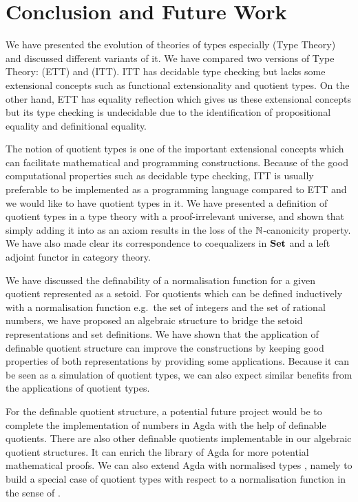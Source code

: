 \chapter{Conclusion and Future Work}

We have presented the evolution of theories of types especially \mltt (Type Theory) and discussed different variants of it.  We have compared two versions of Type Theory: \ett (ETT) and \itt (ITT). ITT has decidable type checking but lacks some extensional concepts such as functional extensionality and quotient types. On the other hand,  ETT has equality reflection which gives us these extensional concepts but its type checking is undecidable due to the identification of propositional equality and definitional equality.


The notion of quotient types is one of the important extensional concepts which can facilitate mathematical and programming constructions. Because of the good computational properties such as decidable type checking, ITT is usually preferable to be implemented as a programming language compared to ETT and we would like to have quotient types in it. We have presented a definition of quotient types in a type theory with a proof-irrelevant universe, and shown that simply adding it into \itt as an axiom results in the loss of the $\mathbb{N}$-canonicity property. We have also made clear its correspondence to coequalizers in $\operatorname{\mathbf{Set}}$ and a left adjoint functor in category theory.


We have discussed the definability of a normalisation function for a given quotient represented as a setoid. For quotients which can be defined inductively with a normalisation function e.g.\ the set of integers and the set of rational numbers, we have proposed an algebraic structure to bridge the setoid representations and set definitions.
We have shown that the application of definable quotient structure can improve the constructions by keeping good properties of both representations by providing some applications. Because it can be seen as a simulation of quotient types, we can also expect similar benefits from the applications of quotient types.


For the definable quotient structure, a potential future project would be to complete the implementation of numbers in Agda with the help of definable quotients. There are also other definable quotients implementable in our algebraic quotient structures. It can enrich the library of Agda for more potential mathematical proofs. We can also extend Agda with normalised types \cite{cou:01}, namely to build a special case of quotient types with respect to a normalisation function in the sense of . 

